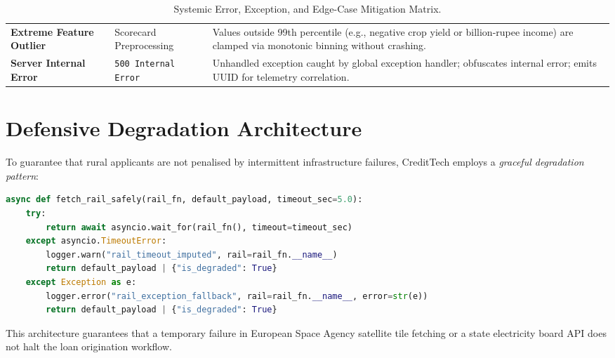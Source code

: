 \begin{table}[H]
\begin{tabularx}{\textwidth}{p{3.2cm} p{3.6cm} X}
  \addlinespace
  \textbf{Extreme Feature Outlier} & Scorecard Preprocessing & Values outside 99th percentile (e.g., negative crop yield or billion-rupee income) are clamped via monotonic binning without crashing. \\
  \addlinespace
  \textbf{Server Internal Error} & \texttt{500 Internal Error} & Unhandled exception caught by global exception handler; obfuscates internal error; emits UUID for telemetry correlation. \\
  \bottomrule
\end{tabularx}
\caption{Systemic Error, Exception, and Edge-Case Mitigation Matrix.}
\label{tab:error_matrix}
\end{table}

\section{Defensive Degradation Architecture}
To guarantee that rural applicants are not penalised by intermittent infrastructure failures, CreditTech employs a \textit{graceful degradation pattern}:
\begin{lstlisting}[language=Python, caption={Defensive Rail Execution with Imputation Fallback.}]
async def fetch_rail_safely(rail_fn, default_payload, timeout_sec=5.0):
    try:
        return await asyncio.wait_for(rail_fn(), timeout=timeout_sec)
    except asyncio.TimeoutError:
        logger.warn("rail_timeout_imputed", rail=rail_fn.__name__)
        return default_payload | {"is_degraded": True}
    except Exception as e:
        logger.error("rail_exception_fallback", rail=rail_fn.__name__, error=str(e))
        return default_payload | {"is_degraded": True}
\end{lstlisting}
This architecture guarantees that a temporary failure in European Space Agency satellite tile fetching or a state electricity board API does not halt the loan origination workflow.

